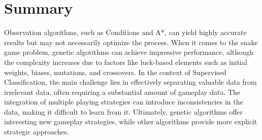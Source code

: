 \section{Summary}

Observation algorithms, such as Conditions and A*, can yield highly accurate results but may not necessarily optimize the process. When it comes to the snake game problem, genetic algorithms can achieve impressive performance, although the complexity increases due to factors like luck-based elements such as initial weights, biases, mutations, and crossovers. In the context of Supervised Classification, the main challenge lies in effectively separating valuable data from irrelevant data, often requiring a substantial amount of gameplay data. The integration of multiple playing strategies can introduce inconsistencies in the data, making it difficult to learn from it. Ultimately, genetic algorithms offer interesting new gameplay strategies, while other algorithms provide more explicit strategic approaches.





